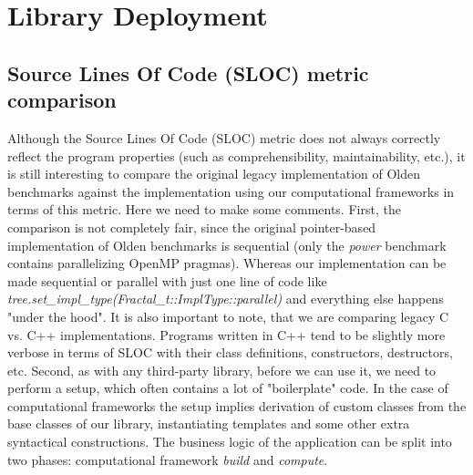 \section{Library Deployment}
\label{frameworks_performance}
\subsection{Source Lines Of Code (SLOC) metric  comparison}
\label{frameworks_loc}
\quad Although the Source Lines Of Code (SLOC) metric does not always correctly reflect the program properties (such as comprehensibility, maintainability, etc.), it is still interesting to compare the original legacy implementation of Olden benchmarks against the implementation using our computational frameworks in terms of this metric.\newline\null
\quad Here we need to make some comments. First, the comparison is not completely fair, since the original pointer-based implementation of Olden benchmarks is sequential (only the \textit{power} benchmark contains parallelizing OpenMP pragmas). Whereas our implementation can be made sequential or parallel with just one line of code like \textit{tree.set\_impl\_type(Fractal\_t::ImplType::parallel)} and everything else happens "under the hood". It is also important to note, that we are comparing legacy C vs. C++ implementations. Programs written in C++ tend to be slightly more verbose in terms of SLOC with their class definitions, constructors, destructors, etc. Second, as with any third-party library, before we can use it, we need to perform a setup, which often contains a lot of "boilerplate" code. In the case of computational frameworks the setup implies derivation of custom classes from the base classes of our library, instantiating templates and some other extra syntactical constructions. The business logic of the application can be split into two phases: computational framework \textit{build} and \textit{compute}.\newline\null
